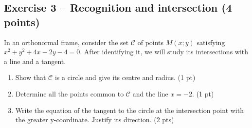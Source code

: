 \subsection*{Exercise 3 -- Recognition and intersection (4 points)}
In an orthonormal frame, consider the set $\mathcal C$ of points $M(x;y)$ satisfying $x^2+y^2+4x-2y-4=0$. After identifying it, we will study its intersections with a line and a tangent.
\begin{enumerate}
\item Show that $\mathcal C$ is a circle and give its centre and radius. \hfill(1 pt)
\item Determine all the points common to $\mathcal C$ and the line $x=-2$. \hfill(1 pt)
\item Write the equation of the tangent to the circle at the intersection point with the greater y-coordinate. Justify its direction. \hfill(2 pts)
\end{enumerate}
